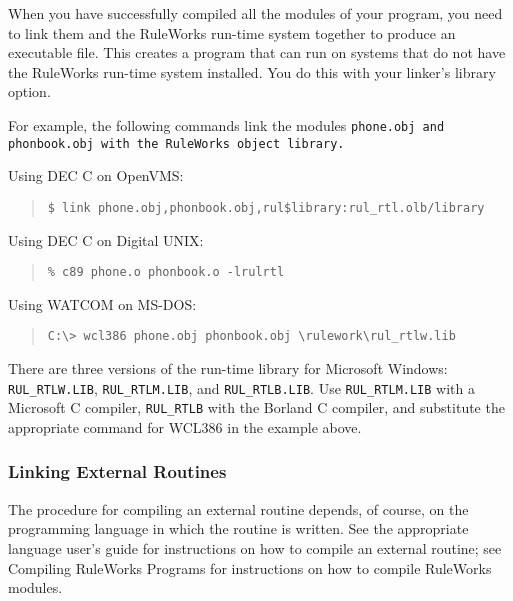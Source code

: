 When you have successfully compiled all the modules of your program,
you need to link them and the RuleWorks run-time system together to
produce an executable file.  This creates a program that can run on
systems that do not have the RuleWorks run-time system installed. You
do this with your linker's library option.

For example, the following commands link the modules \tt{phone.obj} and
\tt{phonbook.obj} with the RuleWorks object library.

Using DEC C on OpenVMS:

\begin{quote}
\begin{verbatim}
$ link phone.obj,phonbook.obj,rul$library:rul_rtl.olb/library
\end{verbatim}
\end{quote}  

Using DEC C on Digital UNIX:

\begin{quote}
\begin{verbatim}
% c89 phone.o phonbook.o -lrulrtl
\end{verbatim}
\end{quote}

Using WATCOM on MS-DOS:

\begin{quote}
\begin{verbatim}
C:\> wcl386 phone.obj phonbook.obj \rulework\rul_rtlw.lib
\end{verbatim}
\end{quote}  

There are three versions of the run-time library for Microsoft
Windows: \verb|RUL_RTLW.LIB|, \verb|RUL_RTLM.LIB|, and
\verb|RUL_RTLB.LIB|. Use \verb|RUL_RTLM.LIB| with a Microsoft C
compiler, \verb|RUL_RTLB| with the Borland C compiler, and substitute
the appropriate command for WCL386 in the example above.

\subsubsection{Linking External Routines}

The procedure for compiling an external routine depends, of course, on
the programming language in which the routine is written. See the
appropriate language user's guide for instructions on how to compile
an external routine; see Compiling RuleWorks Programs for instructions
on how to compile RuleWorks modules.

